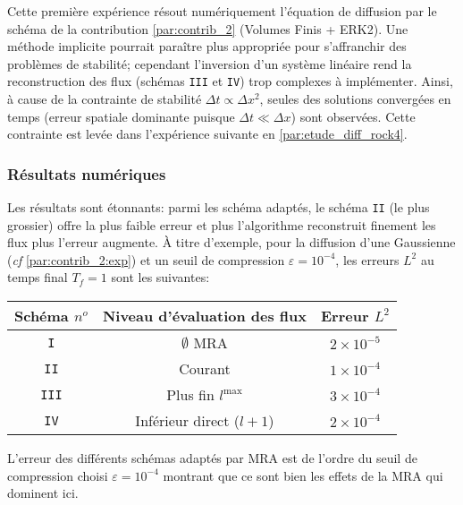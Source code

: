 Cette première expérience résout numériquement l'équation de diffusion par le schéma de la contribution \ref{par:contrib_2} (Volumes Finis + ERK2).
Une méthode implicite pourrait paraître plus appropriée pour s'affranchir des problèmes de stabilité; cependant l'inversion d'un système linéaire rend la reconstruction
des flux (schémas \texttt{III} et \texttt{IV}) trop complexes à implémenter.
Ainsi, à cause de la contrainte de stabilité $\Delta t \propto \Delta x^2$,
seules des solutions convergées en temps (erreur spatiale dominante puisque $\Delta t \ll \Delta x$) sont observées. Cette contrainte est levée dans l'expérience suivante en \ref{par:etude_diff_rock4}.\par 
\subsubsection{Résultats numériques}
Les résultats sont étonnants: parmi les schéma adaptés, le schéma \texttt{II} (le plus grossier) offre la plus faible erreur et plus l'algorithme reconstruit finement les flux plus l'erreur augmente. 
À titre d'exemple, pour la diffusion d'une Gaussienne (\textit{cf} \ref{par:contrib_2:exp}) et un seuil de compression $\varepsilon = 10^{-4}$, les erreurs $L^2$ au temps final $T_f=1$ sont les suivantes:\par
\begin{center}\begin{tabular}{|c|c|c|}
\hline
Schéma $n^o$ & Niveau d'évaluation des flux & Erreur $L^2$ \\
\hline
\texttt{I} & $\emptyset$ MRA & $2 \times 10^{-5}$ \\
\texttt{II} & Courant & $1 \times 10^{-4}$ \\
\texttt{III} & Plus fin $l^{\max}$& $3 \times 10^{-4}$ \\
\texttt{IV} & Inférieur direct ($l+1$) & $2 \times 10^{-4}$ \\


\hline
\end{tabular}\end{center}
L'erreur des différents schémas adaptés par MRA est de l'ordre du seuil de compression choisi $\varepsilon = 10^{-4}$ montrant que ce sont bien
les effets de la MRA qui dominent ici.
